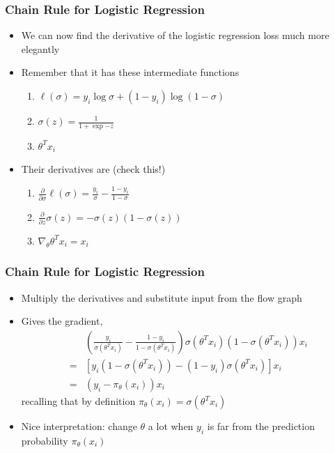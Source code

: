 \documentclass[10pt,mathserif]{beamer}
\begin{document}
\begin{frame}
  \frametitle{Chain Rule for Logistic Regression}
  \begin{itemize}
  \item We can now find the derivative of the logistic regression loss much more
    elegantly
  \item Remember that it has these intermediate functions
    \begin{enumerate}
    \item $\ell\left(\sigma\right) = y_i\log\sigma + \left(1 - y_i\right)\log\left(1 - \sigma\right)$
    \item $\sigma\left(z\right) = \frac{1}{1 + \exp{-z}}$
    \item $\theta^{T}x_i$
    \end{enumerate}
  \item Their derivatives are (check this!)
    \begin{enumerate}
    \item $\frac{\partial}{\partial \sigma}\ell\left(\sigma\right) = \frac{y_i}{\sigma} - \frac{1 - y_i}{1 - \sigma}$
    \item $\frac{\partial}{\partial z}\sigma\left(z\right) = -\sigma\left(z\right)\left(1 - \sigma\left(z\right)\right)$
    \item $\nabla_{\theta} \theta^{T} x_i = x_i$
    \end{enumerate}
  \end{itemize}
\end{frame}

\begin{frame}
  \frametitle{Chain Rule for Logistic Regression}
  \begin{itemize}
  \item Multiply the derivatives and substitute input from the flow graph
  \item Gives the gradient,
    \begin{align*}
      &\left(\frac{y_i}{\sigma\left(\theta^{T}x_i\right)} - \frac{1 - y_i}{1 - \sigma\left(\theta^{T}x_i\right)}\right)\sigma\left(\theta^{T}x_i\right)\left(1 - \sigma\left(\theta^{T}x_i\right)\right)x_i \\
      = &\left[y_i\left(1 - \sigma\left(\theta^{T} x_i\right)\right) - \left(1 - y_i\right)\sigma\left(\theta^T x_i\right)\right]x_i \\
      = &\left(y_i - \pi_{\theta}\left(x_i\right)\right) x_i
    \end{align*}
    recalling that by definition $\pi_{\theta}\left(x_i\right) =
    \sigma\left(\theta^T x_i\right)$
  \item Nice interpretation: change $\theta$ a lot when $y_i$ is far from the
    prediction probability $\pi_{\theta}\left(x_i\right)$
  \end{itemize}
\end{frame}
\end{document}
